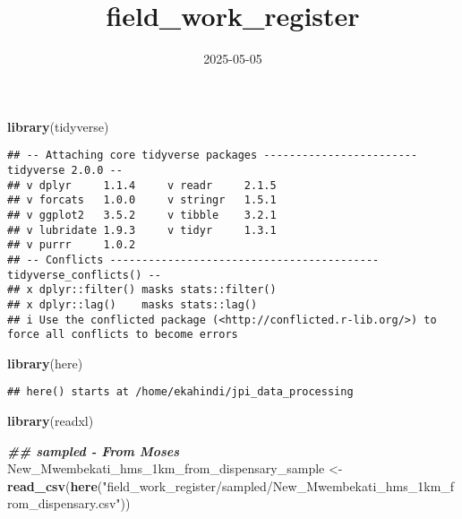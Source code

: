 \documentclass[
]{article}
\title{field\_work\_register}
\author{}
\date{\vspace{-2.5em}2025-05-05}
\newenvironment{Shaded}{\begin{snugshade}}{\end{snugshade}}
\newcommand{\DocumentationTok}[1]{\textcolor[rgb]{0.56,0.35,0.01}{\textbf{\textit{#1}}}}
\newcommand{\FunctionTok}[1]{\textcolor[rgb]{0.13,0.29,0.53}{\textbf{#1}}}
\newcommand{\NormalTok}[1]{#1}
\newcommand{\OtherTok}[1]{\textcolor[rgb]{0.56,0.35,0.01}{#1}}
\newcommand{\StringTok}[1]{\textcolor[rgb]{0.31,0.60,0.02}{#1}}
\begin{document}
\maketitle

\begin{Shaded}
\begin{Highlighting}[]
\FunctionTok{library}\NormalTok{(tidyverse)}
\end{Highlighting}
\end{Shaded}

\begin{verbatim}
## -- Attaching core tidyverse packages ------------------------ tidyverse 2.0.0 --
## v dplyr     1.1.4     v readr     2.1.5
## v forcats   1.0.0     v stringr   1.5.1
## v ggplot2   3.5.2     v tibble    3.2.1
## v lubridate 1.9.3     v tidyr     1.3.1
## v purrr     1.0.2     
## -- Conflicts ------------------------------------------ tidyverse_conflicts() --
## x dplyr::filter() masks stats::filter()
## x dplyr::lag()    masks stats::lag()
## i Use the conflicted package (<http://conflicted.r-lib.org/>) to force all conflicts to become errors
\end{verbatim}

\begin{Shaded}
\begin{Highlighting}[]
\FunctionTok{library}\NormalTok{(here)}
\end{Highlighting}
\end{Shaded}

\begin{verbatim}
## here() starts at /home/ekahindi/jpi_data_processing
\end{verbatim}

\begin{Shaded}
\begin{Highlighting}[]
\FunctionTok{library}\NormalTok{(readxl)}
\end{Highlighting}
\end{Shaded}

\begin{Shaded}
\begin{Highlighting}[]
\DocumentationTok{\#\# sampled {-} From Moses }
\NormalTok{New\_Mwembekati\_hms\_1km\_from\_dispensary\_sample }\OtherTok{\textless{}{-}} \FunctionTok{read\_csv}\NormalTok{(}\FunctionTok{here}\NormalTok{(}\StringTok{"field\_work\_register/sampled/New\_Mwembekati\_hms\_1km\_from\_dispensary.csv"}\NormalTok{))}
\end{Highlighting}
\end{Shaded}
\end{document}
